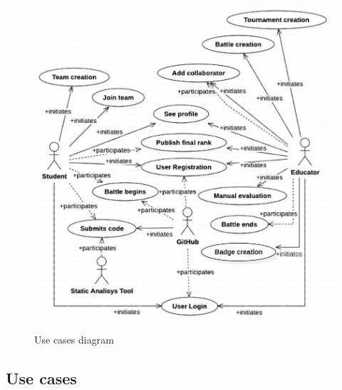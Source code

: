 \begin{figure}
    \centering
    \includegraphics[width=15cm]{Images/ucd.jpg}
    \caption{Use cases diagram}
    \label{fig:enter-label}
\end{figure}

\subsection{Use cases}

